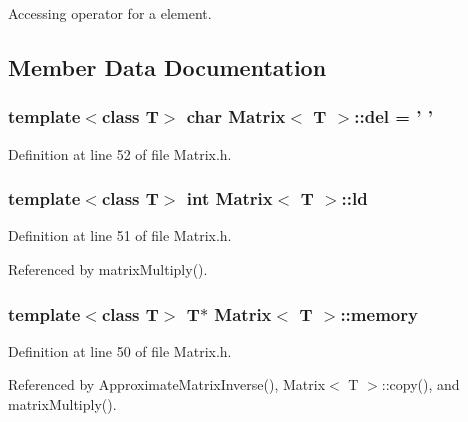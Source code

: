 Accessing operator for a element. 



\subsection{Member Data Documentation}
\hypertarget{singletonMatrix_a97c4971ed81b3fe5aa55c05cd5ec7a4b}{}
\subsubsection[{del}]{\setlength{\rightskip}{0pt plus 5cm}template$<$class T$>$ char {\bf Matrix}$<$ T $>$\+::del = ' '\hspace{0.3cm}{\ttfamily [static]}}\label{singletonMatrix_a97c4971ed81b3fe5aa55c05cd5ec7a4b}


Definition at line 52 of file Matrix.\+h.

\hypertarget{singletonMatrix_ac0297673d046ad5f9eaa4d621a95d6c8}{}
\subsubsection[{ld}]{\setlength{\rightskip}{0pt plus 5cm}template$<$class T$>$ int {\bf Matrix}$<$ T $>$\+::ld}\label{singletonMatrix_ac0297673d046ad5f9eaa4d621a95d6c8}


Definition at line 51 of file Matrix.\+h.



Referenced by matrix\+Multiply().

\hypertarget{singletonMatrix_ae50290f97073a6d396def5da5b36d811}{}
\subsubsection[{memory}]{\setlength{\rightskip}{0pt plus 5cm}template$<$class T$>$ T$\ast$ {\bf Matrix}$<$ T $>$\+::memory}\label{singletonMatrix_ae50290f97073a6d396def5da5b36d811}


Definition at line 50 of file Matrix.\+h.



Referenced by Approximate\+Matrix\+Inverse(), Matrix$<$ T $>$\+::copy(), and matrix\+Multiply().

\hypertarget{singletonMatrix_aa3b73b40cb492b1a2b73c94fc5c3e212}{}
